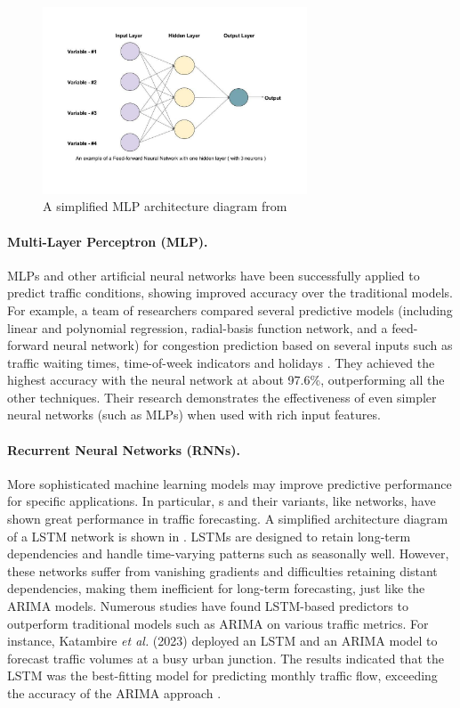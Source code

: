 \begin{figure}[!ht]
  \centering
  \includegraphics[width=0.7\textwidth]{images/background/mlp.pdf}
  \caption[A simplified MLP architecture diagram]{A simplified MLP architecture diagram from~\cite{gupta_understanding_2017}}
  \label{fig:MLP}
\end{figure} 

\paragraph{Multi-Layer Perceptron (MLP).} MLPs and other artificial neural networks have been successfully applied to predict traffic conditions, showing improved accuracy over the traditional models. For example, a team of researchers compared several predictive models (including linear and polynomial regression, radial-basis function network, and a feed-forward neural network) for congestion prediction based on several inputs such as traffic waiting times, time-of-week indicators and holidays \cite{noauthor_traffic_nodate}. They achieved the highest accuracy with the neural network at about 97.6\%, outperforming all the other techniques. Their research demonstrates the effectiveness of even simpler neural networks (such as MLPs) when used with rich input features.

\paragraph{Recurrent Neural Networks (RNNs).} More sophisticated machine learning models may improve predictive performance for specific applications. In particular, s and their variants, like  networks, have shown great performance in traffic forecasting. A simplified architecture diagram of a LSTM network is shown in . LSTMs are designed to retain long-term dependencies and handle time-varying patterns such as seasonally well. However, these networks suffer from vanishing gradients and difficulties retaining distant dependencies, making them inefficient for long-term forecasting, just like the ARIMA models. Numerous studies have found LSTM-based predictors to outperform traditional models such as ARIMA on various traffic metrics. For instance, Katambire \textit{et al.} (2023) deployed an LSTM and an ARIMA model to forecast traffic volumes at a busy urban junction. The results indicated that the LSTM was the best-fitting model for predicting monthly traffic flow, exceeding the accuracy of the ARIMA approach \cite{katambire_forecasting_2023}.


